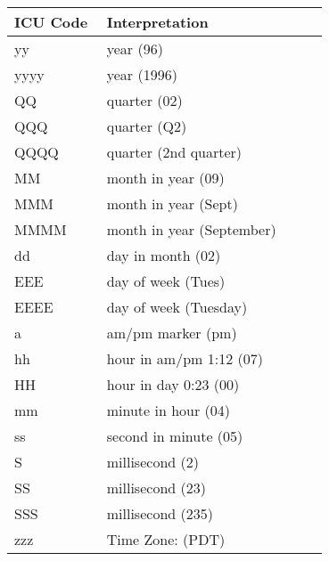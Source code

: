 \begin{table}[ht]
\centering
\bgroup
\def\arraystretch{1.5}
\begin{tabular}{|p{0.2\linewidth}| p{0.5\linewidth}|}
\hline
\textbf{ICU Code} & \textbf{Interpretation}\\ \hline

\scriptsize{yy} & \scriptsize{year (96)}\\ \hline
\scriptsize{yyyy} & \scriptsize{year (1996)}\\ \hline
    
\scriptsize{QQ} & \scriptsize{quarter (02)}\\ \hline
\scriptsize{QQQ} & \scriptsize{quarter (Q2)}\\ \hline
\scriptsize{QQQQ} & \scriptsize{quarter (2nd quarter)}\\ \hline
    
\scriptsize{MM} & \scriptsize{month in year (09)}\\ \hline
\scriptsize{MMM} & \scriptsize{month in year (Sept)}\\ \hline
\scriptsize{MMMM} & \scriptsize{month in year (September)}\\ \hline
    
\scriptsize{dd} & \scriptsize{day in month (02)}\\ \hline
    
\scriptsize{EEE} & \scriptsize{day of week (Tues)}\\ \hline
\scriptsize{EEEE} & \scriptsize{day of week (Tuesday)}\\ \hline
    
\scriptsize{a} & \scriptsize{am/pm marker (pm)}\\ \hline
    
\scriptsize{hh} & \scriptsize{hour in am/pm 1:12 (07)}\\ \hline
\scriptsize{HH} & \scriptsize{hour in day 0:23 (00)}\\ \hline
\scriptsize{mm} & \scriptsize{minute in hour (04)}\\ \hline
\scriptsize{ss} & \scriptsize{second in minute (05)}\\ \hline
    
\scriptsize{S} & \scriptsize{millisecond (2)}\\ \hline
\scriptsize{SS} & \scriptsize{millisecond (23)}\\ \hline
\scriptsize{SSS} & \scriptsize{millisecond (235)}\\ \hline

\scriptsize{zzz} & \scriptsize{Time Zone: (PDT)}\\ \hline


\end{tabular}
\end{table}
